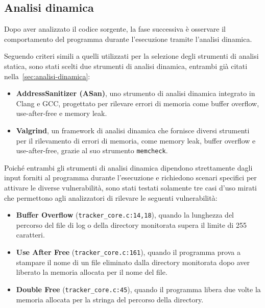 \subsection*{Analisi dinamica}
Dopo aver analizzato il codice sorgente, la fase successiva è osservare il comportamento
del programma durante l'esecuzione tramite l'analisi dinamica.

Seguendo criteri simili a quelli utilizzati per la selezione degli strumenti di analisi
statica, sono stati scelti due strumenti di analisi dinamica, entrambi già citati
nella~\autoref{sec:analisi-dinamica}:
\begin{itemize}
  \item \textbf{AddressSanitizer (ASan)}, uno strumento di analisi dinamica integrato
    in Clang e GCC, progettato per rilevare errori di memoria come buffer
    overflow, use-after-free e memory leak.

  \item \textbf{Valgrind}, un framework di analisi dinamica che fornisce diversi
    strumenti per il rilevamento di errori di memoria, come memory leak, buffer overflow
    e use-after-free, grazie al suo strumento \texttt{memcheck}.
\end{itemize}

\noindent
Poiché entrambi gli strumenti di analisi dinamica dipendono strettamente dagli input
forniti al programma durante l'esecuzione e richiedono scenari specifici per attivare
le diverse vulnerabilità, sono stati testati solamente tre casi d'uso mirati che
permettono agli analizzatori di rilevare le seguenti vulnerabilità:
\begin{itemize}
  \item \textbf{Buffer Overflow} (\texttt{tracker\_core.c:14,18}), quando la
    lunghezza del percorso del file di log o della directory monitorata supera
    il limite di 255 caratteri.

  \item \textbf{Use After Free} (\texttt{tracker\_core.c:161}), quando il
    programma prova a stampare il nome di un file eliminato dalla directory
    monitorata dopo aver liberato la memoria allocata per il nome del file.

  \item \textbf{Double Free} (\texttt{tracker\_core.c:45}), quando il programma
    libera due volte la memoria allocata per la stringa del percorso della
    directory.
\end{itemize}

